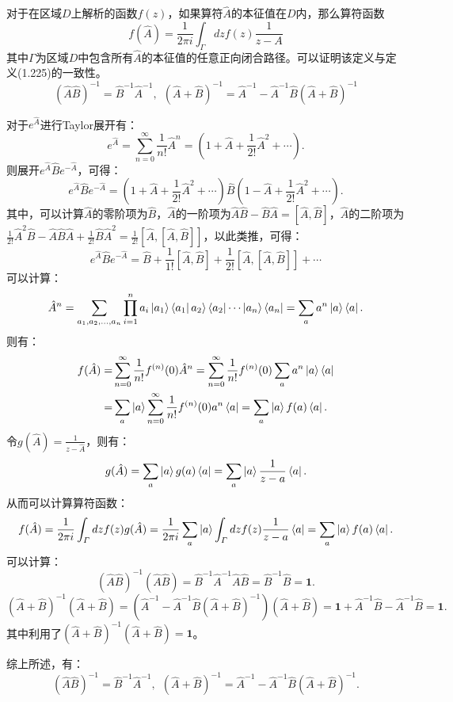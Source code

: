 \documentclass[reqno,a4paper,12pt]{amsart}
\begin{document}
对于在区域$D$上解析的函数$f(z)$，如果算符$\hat{A}$的本征值在$D$内，那么算符函数
\[
	f(\hat{A}) = \frac{1}{2\pi i} \int_{\varGamma} dz f(z) \frac{1}{z-A}
\]
其中$\varGamma$为区域$D$中包含所有$\hat{A}$的本征值的任意正向闭合路径。可以证明该定义与定义(1.225)的一致性。
\[
	(\hat{A}\hat{B})^{-1} = \hat{B}^{-1} \hat{A}^{-1}, \ \ (\hat{A}+\hat{B})^{-1} = \hat{A}^{-1} - \hat{A}^{-1}\hat{B}(\hat{A}+\hat{B})^{-1}
\]
\begin{tcolorbox}[breakable, colback = black!5!white, colframe = black]
对于$e^{\hat{A}}$进行Taylor展开有：
\[
	e^{\hat{A}} = \sum_{n=0}^\infty \frac{1}{n!} \hat{A}^n = \left( 1 + \hat{A} + \frac{1}{2!}\hat{A}^2 + \cdots \right).
\]
则展开$e^{\hat{A}} \hat{B} e^{-\hat{A}}$，可得：
\[
	e^{\hat{A}} \hat{B} e^{-\hat{A}} = \left( 1 + \hat{A} + \frac{1}{2!}\hat{A}^2 + \cdots \right) \hat{B} \left( 1 - \hat{A} + \frac{1}{2!}\hat{A}^2 + \cdots \right).
\]
其中，可以计算$\hat{A}$的零阶项为$\hat{B}$，$\hat{A}$的一阶项为$\hat{A}\hat{B} - \hat{B}\hat{A} = [\hat{A}, \hat{B}]$，$\hat{A}$的二阶项为$\frac{1}{2!}\hat{A}^2\hat{B}-\hat{A}\hat{B}\hat{A} + \frac{1}{2!}\hat{B}\hat{A}^2 = \frac{1}{2!}[\hat{A}, [\hat{A},\hat{B}]]$，以此类推，可得：
\[
	e^{\hat{A}} \hat{B} e^{-\hat{A}} = \hat{B} + \frac{1}{1!}[\hat{A}, \hat{B}] + \frac{1}{2!}[\hat{A},[\hat{A},\hat{B}]] + \cdots
\]
可以计算：
\[
	\hat{A}^n = \sum_{a_1,a_2,...,a_n} \prod_{i=1}^n a_i \ket{a_1} \bra{a_1} a_2 \rangle \bra{a_2} \cdots \ket{a_n} \bra{a_n} = \sum_a a^n \ket{a} \bra{a}.
\]
则有：
\begin{align*}
	f(\hat{A}) =& \sum_{n=0}^\infty \frac{1}{n!} f^{(n)}(0) \hat{A}^n = \sum_{n=0}^\infty \frac{1}{n!} f^{(n)}(0) \sum_{a} a^n \ket{a} \bra{a} \\
	=& \sum_a \ket{a} \sum_{n=0}^\infty \frac{1}{n!} f^{(n)}(0) a^n \bra{a} = \sum_a \ket{a} f(a) \bra{a}.
\end{align*}
令$g(\hat{A}) = \frac{1}{z-\hat{A}}$，则有：
\[
	g(\hat{A}) = \sum_a \ket{a} g(a) \bra{a} = \sum_a \ket{a} \frac{1}{z-a} \bra{a}.
\]
从而可以计算算符函数：
\[
	f(\hat{A}) = \frac{1}{2\pi i} \int_\varGamma dz f(z) g(\hat{A}) = \frac{1}{2\pi i} \sum_a \ket{a} \int_\varGamma dz f(z) \frac{1}{z-a} \bra{a} = \sum_a \ket{a} f(a) \bra{a}.
\]
可以计算：
\[
	(\hat{A}\hat{B})^{-1}(\hat{A}\hat{B}) = \hat{B}^{-1}\hat{A}^{-1} \hat{A}\hat{B} = \hat{B}^{-1} \hat{B} = \mathbf{1}.
\]
\[
	(\hat{A}+\hat{B})^{-1}(\hat{A}+\hat{B}) = (\hat{A}^{-1}-\hat{A}^{-1} \hat{B} (\hat{A}+\hat{B})^{-1}) (\hat{A}+\hat{B}) = \mathbf{1} + \hat{A}^{-1}\hat{B} - \hat{A}^{-1}\hat{B} = \mathbf{1}.
\]
其中利用了$(\hat{A}+\hat{B})^{-1}(\hat{A}+\hat{B}) = \mathbf{1}$。

综上所述，有：
\[
	(\hat{A}\hat{B})^{-1} = \hat{B}^{-1} \hat{A}^{-1}, \ \ (\hat{A}+\hat{B})^{-1} = \hat{A}^{-1} - \hat{A}^{-1}\hat{B}(\hat{A}+\hat{B})^{-1}.
\]
\end{tcolorbox}
\end{document}
